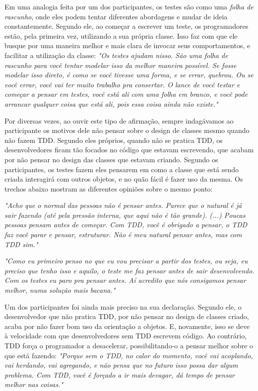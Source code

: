 Em uma analogia feita por um dos participantes, os testes são como uma 
\textit{folha de rascunho}, 
onde eles podem tentar diferentes abordagens e mudar de ideia constantemente. Segundo ele,
ao começar a escrever um teste, os programadores estão, pela primeira vez, utilizando a sua 
própria classe. Isso faz com que ele busque por uma maneira melhor e mais clara de invocar
seus comportamentos, e facilitar a utilização da classe:
\textit{"Os testes ajudam nisso. São uma folha de rascunho para você tentar modelar
isso da melhor maneira possível. Se fosse modelar isso direto, é como se você tivesse
uma forma, e se errar, quebrou. Ou se você errar, você vai ter muito trabalho pra consertar.
O lance de você testar e começar a pensar em testes, você está ali com uma folha em branco,
e você pode arrancar qualquer coisa que está ali, pois essa coisa ainda não existe."}

Por diversas vezes, ao ouvir este tipo de afirmação, sempre indagávamos ao participante
os motivos dele não pensar sobre o design de classes mesmo quando não fazem TDD. 
Segundo eles próprios, quando não se pratica TDD, os desenvolvedores ficam
tão focados no código que estavam escrevendo, que acabam por não pensar no
design das classes que estavam criando. Segundo os participantes, os testes fazem eles pensarem
em como a classe que está sendo criada interagirá com outros objetos, e no quão
fácil é fazer uso da mesma.
Os trechos abaixo mostram as diferentes opiniões sobre o mesmo ponto:

\textit{"Acho que o normal das pessoas não é pensar antes. Parece que o natural
é já sair fazendo (até pela pressão interna, que aqui não é tão grande). (...) Poucas pessoas pensam
antes de começar. Com TDD, você é obrigado a pensar, o TDD faz você parar e pensar, estruturar. Não
é meu natural pensar antes, mas com TDD sim."}

\textit{"Como eu primeiro penso no que eu vou precisar a partir dos testes, ou seja, eu preciso que tenho
isso e aquilo, o teste me faz pensar antes de sair desenvolvendo. Com os testes eu paro pra pensar antes.
Aí acredito que nós consigamos pensar melhor, numa solução mais bacana."}

Um dos participantes foi ainda mais preciso na sua declaração. Segundo ele, o desenvolvedor que não pratica
TDD, por não pensar no design de classes criado, acaba por não fazer bom uso da orientação a objetos.
E, novamente, isso se deve à velocidade com que desenvolvedores sem TDD escrevem código. Ao contrário,
TDD força o programador a desacelerar, possibilitando-o a pensar melhor sobre o que está fazendo:
\textit{"Porque sem o TDD, no calor do momento, você vai acoplando, vai herdando, vai agregando, e não pensa
que no futuro isso possa dar algum problema. Com TDD, você é forçado a ir mais devagar, dá tempo de pensar melhor nas
coisas."}


